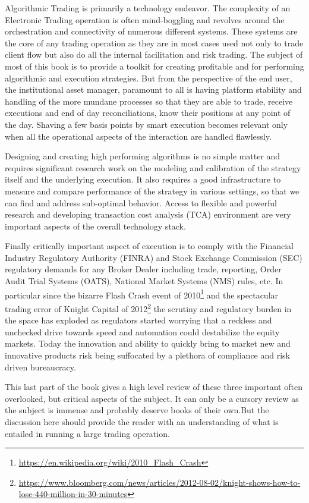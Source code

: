 
Algorithmic Trading is primarily a technology endeavor. The complexity of an Electronic Trading operation is often mind-boggling and revolves around the orchestration and connectivity of numerous different systems. These systems are the core of any trading operation as they are in most cases used not only to trade client flow but also do all the internal facilitation and risk trading. The subject of most of this book is to provide a toolkit for creating profitable and for performing algorithmic and execution strategies. But from the perspective of the end user, the institutional asset manager, paramount to all is having platform stability and handling of the more mundane processes so that they are able to trade, receive executions and end of day reconciliations, know their positions at any point of the day. Shaving a few basis points by smart execution becomes relevant only when all the operational aspects of the interaction are handled flawlessly.


Designing and creating high performing algorithms is no simple matter and requires significant research work on the modeling and calibration of the strategy itself and the underlying execution. It also requires a good infrastructure to measure and compare  performance of the strategy in various settings, so that we can find and address sub-optimal behavior. Access to flexible and powerful research and developing transaction cost analysis (TCA) environment are very important aspects of the overall technology stack.


Finally critically important aspect of execution is to comply with the Financial Industry Regulatory Authority (FINRA) and Stock Exchange Commission (SEC) regulatory demands for any Broker Dealer including trade, reporting, Order Audit Trial Systems (OATS), National Market Systems (NMS) rules, etc. In particular since the bizarre Flash Crash event of 2010\footnote{\url{https://en.wikipedia.org/wiki/2010_Flash_Crash}} and the spectacular trading error of Knight Capital of 2012\footnote{\url{https://www.bloomberg.com/news/articles/2012-08-02/knight-shows-how-to-lose-440-million-in-30-minutes}} the scrutiny and regulatory burden in the space has exploded as regulators started worrying that a reckless and unchecked drive towards speed and automation could destabilize the equity markets. Today the innovation and ability to quickly bring to market new and innovative products risk being suffocated by a plethora of compliance and risk driven bureaucracy. 


This last part of the book gives a high level review of these three important often overlooked, but critical aspects of the subject. It can only be a cursory review as the subject is immense and probably deserve books of their own.But the discussion here should provide the reader with an understanding of what is entailed in running a large trading operation.



